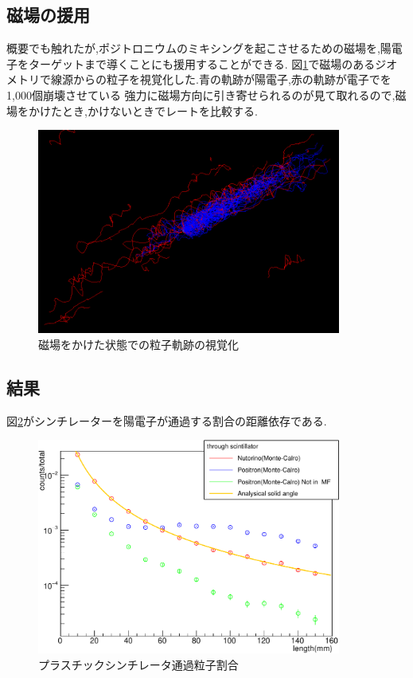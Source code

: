 \subsection{磁場の援用}
概要でも触れたが,ポジトロニウムのミキシングを起こさせるための磁場を,陽電子をターゲットまで導くことにも援用することができる.
図\ref{mag_effect}で磁場のあるジオメトリで線源からの粒子を視覚化した.青の軌跡が陽電子,赤の軌跡が電子でを1,000個崩壊させている
強力に磁場方向に引き寄せられるのが見て取れるので,磁場をかけたとき,かけないときでレートを比較する.

\begin{figure}[htbp]
	\centering
		\includegraphics[width=10cm]{img/mag_effect.png}
	\caption{磁場をかけた状態での粒子軌跡の視覚化}
	\label{mag_effect}
\end{figure}


\subsection{結果}

図\ref{scinti_test}がシンチレーターを陽電子が通過する割合の距離依存である.

\begin{figure}[htbp]
	\centering
		\includegraphics[width=10cm]{fig/scinti_test.pdf}
	\caption{プラスチックシンチレータ通過粒子割合}
	\label{scinti_test}
\end{figure}

